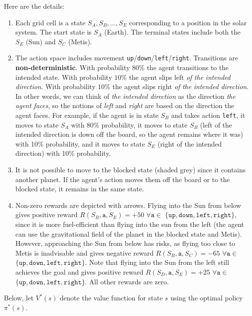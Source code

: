\documentclass[11pt,addpoints,answers]{exam}
\begin{document}
\begin{questions}
Here are the details:

\begin{enumerate}
    \item Each grid cell is a state $S_A, S_B,..., S_E$ corresponding to a position in the solar system. The start state is $S_A$ (Earth). The terminal states include both the $S_E$ (Sun) and $S_C$ (Metis).
    \item The action space includes movement \texttt{up}/\texttt{down}/\texttt{left}/\texttt{right}. Transitions are \textbf{non-deterministic}. With probability $80\%$ the agent transitions to the intended state. With probability $10\%$ the agent slips left \emph{of the intended direction}. With probability $10\%$ the agent slips right \emph{of the intended direction}. In other words, we can think of \emph{the intended direction} as the direction \emph{the agent faces}, so the notions of \emph{left} and \emph{right} are based on the direction the agent faces. For example, if the agent is in state $S_B$ and takes action \texttt{left},  it moves to state $S_A$ with 80\% probability, it moves to state $S_B$ (left of the intended direction is down off the board, so the agent remains where it was) with 10\% probability, and it moves to state $S_E$ (right of the intended direction)  with 10\% probability.
    \item It is not possible to move to the blocked state (shaded grey) since it contains another planet. If the agent's action moves them off the board or to the blocked state, it remains in the same state.
    \item Non-zero rewards are depicted with arrows. Flying into the Sun from below gives positive reward $R(S_B, \texttt{a}, S_E) = +50$ $\forall \texttt{a} \in$ $\{\texttt{up},\texttt{down},\texttt{left},\texttt{right}\}$, since it is more fuel-efficient than flying into the sun from the left (the agent can use the gravitational field of the planet in the blocked state and Metis). However, approaching the Sun from below has risks, as flying too close to Metis is inadvisable and gives negative reward $R(S_B, \texttt{a}, S_C) = -65$ $\forall \texttt{a} \in$ $\{\texttt{up},\texttt{down},\texttt{left},\texttt{right}\}$. Note that flying into the Sun from the left still achieves the goal and gives positive reward $R(S_D, \texttt{a}, S_E) = +25$ $\forall \texttt{a} \in$ $\{\texttt{up},\texttt{down},\texttt{left},\texttt{right}\}$. All other rewards are zero.
\end{enumerate}

    
Below, let $V^*(s)$ denote the value function for state $s$ using the optimal policy $\pi^*(s)$.


\end{questions}
\end{document}
